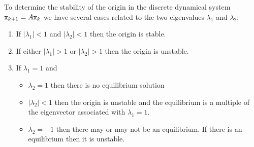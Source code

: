 \begin{thm}
    To determine the stability of the origin in the discrete dynamical system
    $\texttt{x}_{k+1}=A\texttt{x}_k$ we have several cases related to the two eigenvalues $\lambda_1$
    and $\lambda_2$:

    \begin{enumerate}
        \item If $|\lambda_1|<1$ and $|\lambda_2|<1$ then the origin is stable.
        \item If either $|\lambda_1|>1$ or $|\lambda_2|>1$ then the origin is unstable.
        \item If $\lambda_1=1$ and 
            \begin{itemize}
                \item $\lambda_2=1$ then there is no equilibrium solution
                \item $|\lambda_2|<1$ then the origin is unstable and the equilibrium is a
                    multiple of the eigenvector associated with $\lambda_1=1$.
                \item $\lambda_2=-1$ then there may or may not be an equilibrium.  If
                    there is an equilibrium then it is unstable.
            \end{itemize}

    \end{enumerate}
\end{thm}

